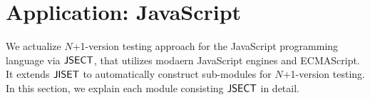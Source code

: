\section{Application: JavaScript}\label{sec:application}

We actualize $N$+1-version testing approach for the JavaScript programming
language via $\text{\sf JSECT}$, that utilizes modaern JavaScript engines and ECMAScript.
It extends $\text{\sf JISET}$ to automatically construct sub-modules for $N$+1-version
testing.  In this section, we explain each module consisting $\text{\sf JSECT}$ in detail.






